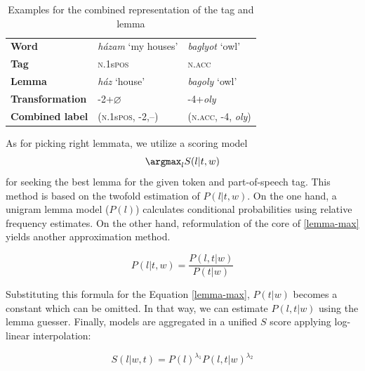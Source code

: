 \begin{table}[ht]
\centering
\caption{Examples for the combined representation of the tag and lemma}
\label{tab:lemma-example}
\begin{tabular}{l | l l}
   \textbf{Word} &  \emph{házam} `my houses’ &  \emph{baglyot} `owl’ \\
   \textbf{Tag} &  \textsc{n.1}s\textsc{pos} &  \textsc{n.acc} \\
   \textbf{Lemma} &  \emph{ház} `house’ &  \emph{bagoly} `owl’ \\
   \textbf{Transformation} & -2+$\varnothing$ &  -4+\emph{oly} \\
   \textbf{Combined label} & (\textsc{n.1}s\textsc{pos}, -2,--) &  (\textsc{n.acc}, -4, \emph{oly}) \\
\end{tabular}
\end{table}


As for picking right lemmata, we utilize a scoring model
\begin{equation}\label{lemma-max}
\argmax_l S(l|t,w)
\end{equation}
for seeking the best lemma for the given token and part-of-speech tag. 
This method is based on the twofold estimation of $P(l|t,w)$. On the one hand, a unigram lemma model ($P(l)$) calculates conditional probabilities using relative frequency estimates. 
On the other hand, reformulation of the core of \eqref{lemma-max} yields another approximation method.


\begin{equation}\label{lemma-guesser}
P(l|t,w) = \frac{P(l,t|w)}{P(t|w)}
\end{equation}

Substituting this formula for the Equation \ref{lemma-max}, $P(t|w)$ becomes a constant which can be omitted. 
In that way, we can estimate $P(l,t|w)$ using the lemma guesser. Finally, models are aggregated in a unified $S$ score applying log-linear interpolation: 


\begin{equation}\label{lemma-interpolated}
S(l|w,t) = P(l)^{\lambda_1} P(l,t|w)^{\lambda_2}
\end{equation}

